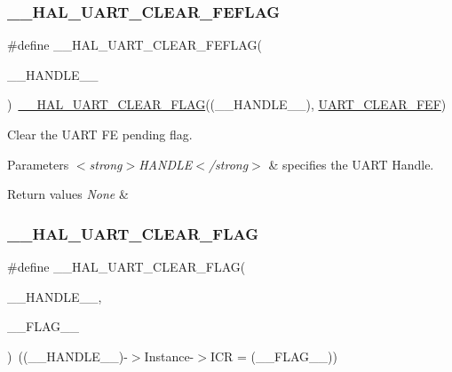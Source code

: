 \subsubsection{\texorpdfstring{\_\_HAL\_UART\_CLEAR\_FEFLAG}{\_\_HAL\_UART\_CLEAR\_FEFLAG}}
{\footnotesize\ttfamily \#define \+\_\+\+\_\+\+H\+A\+L\+\_\+\+U\+A\+R\+T\+\_\+\+C\+L\+E\+A\+R\+\_\+\+F\+E\+F\+L\+AG(\begin{DoxyParamCaption}\item[{}]{\+\_\+\+\_\+\+H\+A\+N\+D\+L\+E\+\_\+\+\_\+ }\end{DoxyParamCaption})~\mbox{\hyperlink{group___u_a_r_t___exported___macros_ga9bd035161d41cde4f2568c7af06493bf}{\+\_\+\+\_\+\+H\+A\+L\+\_\+\+U\+A\+R\+T\+\_\+\+C\+L\+E\+A\+R\+\_\+\+F\+L\+AG}}((\+\_\+\+\_\+\+H\+A\+N\+D\+L\+E\+\_\+\+\_\+), \mbox{\hyperlink{group___u_a_r_t___i_t___c_l_e_a_r___flags_ga2040edf7a1daa2e9f352364e285ef5c3}{U\+A\+R\+T\+\_\+\+C\+L\+E\+A\+R\+\_\+\+F\+EF}})}



Clear the U\+A\+RT FE pending flag. 


\begin{DoxyParams}{Parameters}
{\em $<$strong$>$\+H\+A\+N\+D\+L\+E$<$/strong$>$} & specifies the U\+A\+RT Handle. \\
\hline
\end{DoxyParams}

\begin{DoxyRetVals}{Return values}
{\em None} & \\
\hline
\end{DoxyRetVals}
\mbox{\label{group___u_a_r_t___exported___macros_ga9bd035161d41cde4f2568c7af06493bf}} 
\subsubsection{\texorpdfstring{\_\_HAL\_UART\_CLEAR\_FLAG}{\_\_HAL\_UART\_CLEAR\_FLAG}}
{\footnotesize\ttfamily \#define \+\_\+\+\_\+\+H\+A\+L\+\_\+\+U\+A\+R\+T\+\_\+\+C\+L\+E\+A\+R\+\_\+\+F\+L\+AG(\begin{DoxyParamCaption}\item[{}]{\+\_\+\+\_\+\+H\+A\+N\+D\+L\+E\+\_\+\+\_\+,  }\item[{}]{\+\_\+\+\_\+\+F\+L\+A\+G\+\_\+\+\_\+ }\end{DoxyParamCaption})~((\+\_\+\+\_\+\+H\+A\+N\+D\+L\+E\+\_\+\+\_\+)-\/$>$Instance-\/$>$I\+CR = (\+\_\+\+\_\+\+F\+L\+A\+G\+\_\+\+\_\+))}



